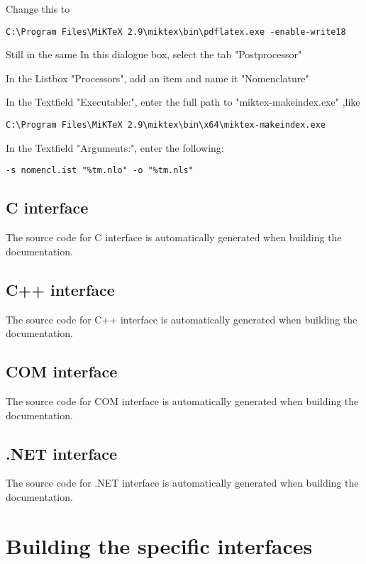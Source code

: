 Change this to

\begin{verbatim}
C:\Program Files\MiKTeX 2.9\miktex\bin\pdflatex.exe -enable-write18
\end{verbatim}

\vpara
Still in the same In this dialogue box, select the tab "Postprocessor"

In the Listbox "Processors", add an item and name it "Nomenclature"

In the Textfield "Executable:", enter the full path to "miktex-makeindex.exe" ,like 
\begin{verbatim}
C:\Program Files\MiKTeX 2.9\miktex\bin\x64\miktex-makeindex.exe
\end{verbatim}
In the Textfield "Arguments:", enter the following:
\begin{verbatim}
-s nomencl.ist "%tm.nlo" -o "%tm.nls"
\end{verbatim}



\subsection{C interface}
The source code for C interface is automatically generated when building the documentation.


\subsection{C++ interface}
The source code for C++ interface is automatically generated when building the documentation.



\subsection{COM interface}
The source code for COM interface is automatically generated when building the documentation.


\subsection{.NET interface}
The source code for .NET interface is automatically generated when building the documentation.


\newpage
\section{Building the specific interfaces}


